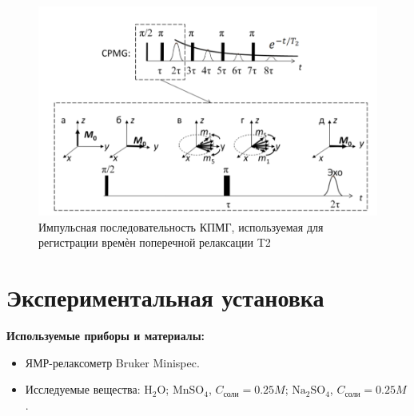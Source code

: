 \documentclass{article}
\begin{document}
\begin{itemize}
\begin{figure}[h!]
    \centering
    \includegraphics[scale = 0.3]{кпмг.png}
    \caption{Импульсная последовательность КПМГ, используемая для регистрации времѐн поперечной релаксации T2}
    \label{fig0}
\end{figure}

 \end{itemize}

\newpage
\section{Экспериментальная установка}

\textbf{Используемые приборы и материалы:}
\begin{itemize}

\item ЯМР-релаксометр Bruker Minispec.

\item Исследуемые вещества: $\text{H}_2\text{O}$; $\text{MnSO}_4$, $C_{\text{соли}}=0.25M$; $\text{Na}_2\text{SO}_4$, $C_{\text{соли}} = 0.25M$.

\end{itemize}
\end{document}
